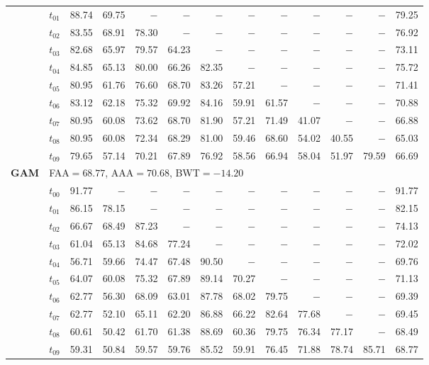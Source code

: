 \begin{table}[ht]
\begin{tabular}{@{}l l r r r r r r r r r r r@{}}
 & $t_{01}$ & 88.74 & 69.75 & $-$ & $-$ & $-$ & $-$ & $-$ & $-$ & $-$ & $-$ & 79.25 \\
 & $t_{02}$ & 83.55 & 68.91 & 78.30 & $-$ & $-$ & $-$ & $-$ & $-$ & $-$ & $-$ & 76.92 \\
 & $t_{03}$ & 82.68 & 65.97 & 79.57 & 64.23 & $-$ & $-$ & $-$ & $-$ & $-$ & $-$ & 73.11 \\
 & $t_{04}$ & 84.85 & 65.13 & 80.00 & 66.26 & 82.35 & $-$ & $-$ & $-$ & $-$ & $-$ & 75.72 \\
 & $t_{05}$ & 80.95 & 61.76 & 76.60 & 68.70 & 83.26 & 57.21 & $-$ & $-$ & $-$ & $-$ & 71.41 \\
 & $t_{06}$ & 83.12 & 62.18 & 75.32 & 69.92 & 84.16 & 59.91 & 61.57 & $-$ & $-$ & $-$ & 70.88 \\
 & $t_{07}$ & 80.95 & 60.08 & 73.62 & 68.70 & 81.90 & 57.21 & 71.49 & 41.07 & $-$ & $-$ & 66.88 \\
 & $t_{08}$ & 80.95 & 60.08 & 72.34 & 68.29 & 81.00 & 59.46 & 68.60 & 54.02 & 40.55 & $-$ & 65.03 \\
 & $t_{09}$ & 79.65 & 57.14 & 70.21 & 67.89 & 76.92 & 58.56 & 66.94 & 58.04 & 51.97 & 79.59 & 66.69 \\
\midrule
\multirow{11}{*}{\textbf{GAM}} & \multicolumn{12}{l}{\quad\small FAA$=68.77$,\; AAA$=70.68$,\; BWT$=-14.20$} \\
 & $t_{00}$ & 91.77 & $-$ & $-$ & $-$ & $-$ & $-$ & $-$ & $-$ & $-$ & $-$ & 91.77 \\
 & $t_{01}$ & 86.15 & 78.15 & $-$ & $-$ & $-$ & $-$ & $-$ & $-$ & $-$ & $-$ & 82.15 \\
 & $t_{02}$ & 66.67 & 68.49 & 87.23 & $-$ & $-$ & $-$ & $-$ & $-$ & $-$ & $-$ & 74.13 \\
 & $t_{03}$ & 61.04 & 65.13 & 84.68 & 77.24 & $-$ & $-$ & $-$ & $-$ & $-$ & $-$ & 72.02 \\
 & $t_{04}$ & 56.71 & 59.66 & 74.47 & 67.48 & 90.50 & $-$ & $-$ & $-$ & $-$ & $-$ & 69.76 \\
 & $t_{05}$ & 64.07 & 60.08 & 75.32 & 67.89 & 89.14 & 70.27 & $-$ & $-$ & $-$ & $-$ & 71.13 \\
 & $t_{06}$ & 62.77 & 56.30 & 68.09 & 63.01 & 87.78 & 68.02 & 79.75 & $-$ & $-$ & $-$ & 69.39 \\
 & $t_{07}$ & 62.77 & 52.10 & 65.11 & 62.20 & 86.88 & 66.22 & 82.64 & 77.68 & $-$ & $-$ & 69.45 \\
 & $t_{08}$ & 60.61 & 50.42 & 61.70 & 61.38 & 88.69 & 60.36 & 79.75 & 76.34 & 77.17 & $-$ & 68.49 \\
 & $t_{09}$ & 59.31 & 50.84 & 59.57 & 59.76 & 85.52 & 59.91 & 76.45 & 71.88 & 78.74 & 85.71 & 68.77 \\

\end{tabular}
\end{table}
